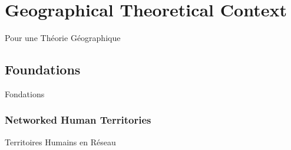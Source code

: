 




\newpage



\section{Geographical Theoretical Context}{Pour une Théorie Géographique}



\subsection{Foundations}{Fondations}



\subsubsection{Networked Human Territories}{Territoires Humains en Réseau}


